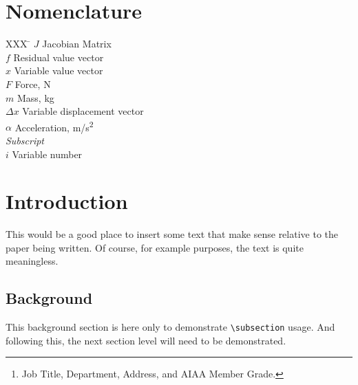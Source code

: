 \documentclass{aiaa-tc}
\author{First M. Last%
         \thanks{Job Title, Department, Address, and AIAA Member Grade.}
         \normalsize\itshape
         Affiliation, City, Province, Zipcode, Country}
\begin{document}
\maketitle

\begin{abstract}
This is a bare-bones \LaTeX{} template of an AIAA technical conference paper.
It is intended to demonstrate the bare minimum set of \LaTeX{} commands
to produce an AIAA technical conference paper.
For detailed AIAA layout and style guidelines, please refer to the AIAA
author guide for paper submission, format, and other procedures.
\end{abstract}

\section*{Nomenclature}

\begin{tabbing}
  XXX \= \kill %
  $J$ \> Jacobian Matrix \\
  $f$ \> Residual value vector \\
  $x$ \> Variable value vector \\
  $F$ \> Force, N \\
  $m$ \> Mass, kg \\
  $\Delta x$ \> Variable displacement vector \\
  $\alpha$ \> Acceleration, m/s\textsuperscript{2} \\[5pt]
  \textit{Subscript}\\
  $i$ \> Variable number \\
 \end{tabbing}

\section{Introduction}

This would be a good place to insert some text that make sense relative
to the paper being written.
Of course, for example purposes, the text is quite meaningless.

\subsection{Background}

This background section is here only to demonstrate \verb|\subsection| usage.
And following this, the next section level will need to be demonstrated.
\end{document}
